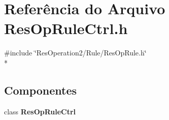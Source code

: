 \section{Referência do Arquivo Res\+Op\+Rule\+Ctrl.\+h}
\label{_res_op_rule_ctrl_8h}
{\ttfamily \#include \char`\"{}Res\+Operation2/\+Rule/\+Res\+Op\+Rule.\+h\char`\"{}}\\*
\subsection*{Componentes}
\begin{DoxyCompactItemize}
\item 
class {\bf Res\+Op\+Rule\+Ctrl}
\end{DoxyCompactItemize}
